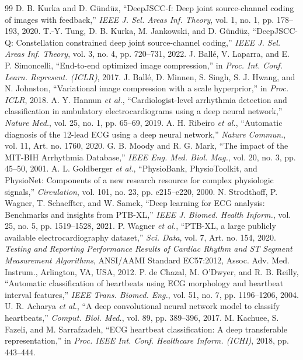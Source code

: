 \documentclass[journal]{IEEEtran}
\begin{document}
\begin{thebibliography}{99}
 D. B. Kurka and D. G\"und\"uz, ``DeepJSCC-f: Deep joint source-channel coding of images with feedback,'' \emph{IEEE J. Sel. Areas Inf. Theory}, vol. 1, no. 1, pp. 178--193, 2020.
 T.-Y. Tung, D. B. Kurka, M. Jankowski, and D. G\"und\"uz, ``DeepJSCC-Q: Constellation constrained deep joint source-channel coding,'' \emph{IEEE J. Sel. Areas Inf. Theory}, vol. 3, no. 4, pp. 720--731, 2022.
 J. Ball\'e, V. Laparra, and E. P. Simoncelli, ``End-to-end optimized image compression,'' in \emph{Proc. Int. Conf. Learn. Represent. (ICLR)}, 2017.
 J. Ball\'e, D. Minnen, S. Singh, S. J. Hwang, and N. Johnston, ``Variational image compression with a scale hyperprior,'' in \emph{Proc. ICLR}, 2018.
 A. Y. Hannun \emph{et al.}, ``Cardiologist-level arrhythmia detection and classification in ambulatory electrocardiograms using a deep neural network,'' \emph{Nature Med.}, vol. 25, no. 1, pp. 65--69, 2019.
 A. H. Ribeiro \emph{et al.}, ``Automatic diagnosis of the 12-lead ECG using a deep neural network,'' \emph{Nature Commun.}, vol. 11, Art. no. 1760, 2020.
 G. B. Moody and R. G. Mark, ``The impact of the MIT-BIH Arrhythmia Database,'' \emph{IEEE Eng. Med. Biol. Mag.}, vol. 20, no. 3, pp. 45--50, 2001.
 A. L. Goldberger \emph{et al.}, ``PhysioBank, PhysioToolkit, and PhysioNet: Components of a new research resource for complex physiologic signals,'' \emph{Circulation}, vol. 101, no. 23, pp. e215--e220, 2000.
 N. Strodthoff, P. Wagner, T. Schaeffter, and W. Samek, ``Deep learning for ECG analysis: Benchmarks and insights from PTB-XL,'' \emph{IEEE J. Biomed. Health Inform.}, vol. 25, no. 5, pp. 1519--1528, 2021.
 P. Wagner \emph{et al.}, ``PTB-XL, a large publicly available electrocardiography dataset,'' \emph{Sci. Data}, vol. 7, Art. no. 154, 2020.
 \emph{Testing and Reporting Performance Results of Cardiac Rhythm and ST Segment Measurement Algorithms}, ANSI/AAMI Standard EC57:2012, Assoc. Adv. Med. Instrum., Arlington, VA, USA, 2012.
 P. de Chazal, M. O'Dwyer, and R. B. Reilly, ``Automatic classification of heartbeats using ECG morphology and heartbeat interval features,'' \emph{IEEE Trans. Biomed. Eng.}, vol. 51, no. 7, pp. 1196--1206, 2004.
 U. R. Acharya \emph{et al.}, ``A deep convolutional neural network model to classify heartbeats,'' \emph{Comput. Biol. Med.}, vol. 89, pp. 389--396, 2017.
 M. Kachuee, S. Fazeli, and M. Sarrafzadeh, ``ECG heartbeat classification: A deep transferable representation,'' in \emph{Proc. IEEE Int. Conf. Healthcare Inform. (ICHI)}, 2018, pp. 443--444.

\end{thebibliography}
\end{document}
